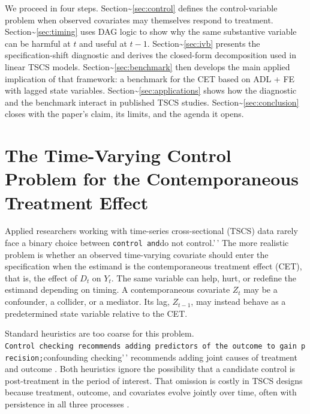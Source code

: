 \documentclass[
]{article}
\begin{document}
We proceed in four steps. Section\textasciitilde{}\ref{sec:control}
defines the control-variable problem when observed covariates may
themselves respond to treatment.
Section\textasciitilde{}\ref{sec:timing} uses DAG logic to show why the
same substantive variable can be harmful at \(t\) and useful at \(t-1\).
Section\textasciitilde{}\ref{sec:ivb} presents the specification-shift
diagnostic and derives the closed-form decomposition used in linear TSCS
models. Section\textasciitilde{}\ref{sec:benchmark} then develops the
main applied implication of that framework: a benchmark for the CET
based on ADL + FE with lagged state variables.
Section\textasciitilde{}\ref{sec:applications} shows how the diagnostic
and the benchmark interact in published TSCS studies.
Section\textasciitilde{}\ref{sec:conclusion} closes with the paper's
claim, its limits, and the agenda it opens.

\section{\texorpdfstring{The Time-Varying Control Problem for the
Contemporaneous Treatment Effect
\label{sec:control}}{The Time-Varying Control Problem for the Contemporaneous Treatment Effect }}\label{the-time-varying-control-problem-for-the-contemporaneous-treatment-effect}

Applied researchers working with time-series cross-sectional (TSCS) data
rarely face a binary choice between
\texttt{control\textquotesingle{}\textquotesingle{}\ and}do not
control.'\,' The more realistic problem is whether an observed
time-varying covariate should enter the specification when the estimand
is the contemporaneous treatment effect (CET), that is, the effect of
\(D_t\) on \(Y_t\). The same variable can help, hurt, or redefine the
estimand depending on timing. A contemporaneous covariate \(Z_t\) may be
a confounder, a collider, or a mediator. Its lag, \(Z_{t-1}\), may
instead behave as a predetermined state variable relative to the CET.

Standard heuristics are too coarse for this problem.
\texttt{Control\ checking\textquotesingle{}\textquotesingle{}\ recommends\ adding\ predictors\ of\ the\ outcome\ to\ gain\ precision;}confounding
checking'\,' recommends adding joint causes of treatment and outcome
\citep{cinelli2021crash}. Both heuristics ignore the possibility that a
candidate control is post-treatment in the period of interest. That
omission is costly in TSCS designs because treatment, outcome, and
covariates evolve jointly over time, often with persistence in all three
processes \citep{blackwell2018make, imai_kim2021}.
\end{document}
